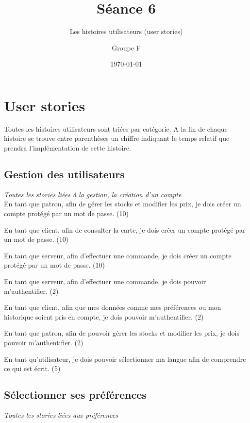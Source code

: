 \documentclass[10pt, a4, oneside, headings=normal]{scrartcl}
\begin{document}
\titlehead{}
\subject{}
\title{Séance 6}
\subtitle{Les histoires utilisateurs (user stories)}
\author{Groupe F}
\publishers{}
\date{\today}

\dedication{}

\maketitle

\section{User stories}
Toutes les histoires utilisateurs sont triées par catégorie. A la fin de chaque histoire se trouve entre parenthèses un chiffre indiquant le temps relatif que prendra l'implémentation de cette histoire.

\subsection{Gestion des utilisateurs}

\emph{Toutes les stories liées à la gestion, la création d'un compte}
\\

En tant que patron, afin de gérer les stocks et modifier les prix, je dois créer un compte protégé par un mot de passe. (10)

En tant que client, afin de consulter la carte, je dois créer un compte protégé par un mot de passe. (10)

En tant que serveur, afin d'effectuer une commande, je dois créer un compte protégé par un mot de passe. (10)

En tant que serveur, afin d'effectuer une commande, je dois pouvoir m'authentifier. (2)

En tant que client, afin que mes données comme mes préférences ou mon historique soient pris en compte, je dois pouvoir m'authentifier. (2)

En tant que patron, afin de pouvoir gérer les stocks et modifier les prix, je dois pouvoir m'authentifier. (2)

En tant qu'utilisateur, je dois pouvoir sélectionner ma langue afin de comprendre ce qui est écrit. (5)

\subsection{Sélectionner ses préférences}
\emph{Toutes les stories liées aux préférences}
\\
\end{document}
